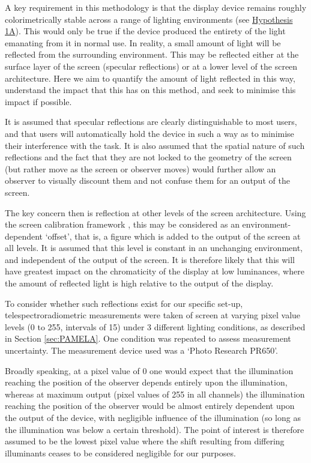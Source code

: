 A key requirement in this methodology is that the display device remains roughly colorimetrically stable across a range of lighting environments (see \hyperref[list:hyp1a]{Hypothesis 1A}). This would only be true if the device produced the entirety of the light emanating from it in normal use. In reality, a small amount of light will be reflected from the surrounding environment. This may be reflected either at the surface layer of the screen (specular reflections) or at a lower level of the screen architecture. Here we aim to quantify the amount of light reflected in this way, understand the impact that this has on this method, and seek to minimise this impact if possible.

It is assumed that specular reflections are clearly distinguishable to most users, and that users will automatically hold the device in such a way as to minimise their interference with the task. It is also assumed that the spatial nature of such reflections and the fact that they are not locked to the geometry of the screen (but rather move as the screen or observer moves) would further allow an observer to visually discount them and not confuse them for an output of the screen.

The key concern then is reflection at other levels of the screen architecture. Using the screen calibration framework \cite{berns_crt_1993}, this may be considered as an environment-dependent `offset', that is, a figure which is added to the output of the screen at all levels. It is assumed that this level is constant in an unchanging environment, and independent of the output of the screen. It is therefore likely that this will have greatest impact on the chromaticity of the display at low luminances, where the amount of reflected light is high relative to the output of the display.

To consider whether such reflections exist for our specific set-up, telespectroradiometric measurements were taken of screen at varying pixel value levels (0 to 255, intervals of 15) under 3 different lighting conditions, as described in Section \ref{sec:PAMELA}. One condition was repeated to assess measurement uncertainty. The measurement device used was a `Photo Research PR650'. 

Broadly speaking, at a pixel value of 0 one would expect that the illumination reaching the position of the observer depends entirely upon the illumination, whereas at maximum output (pixel values of 255 in all channels) the illumination reaching the position of the observer would be almost entirely dependent upon the output of the device, with negligible influence of the illumination (so long as the illumination was below a certain threshold). The point of interest is therefore assumed to be the lowest pixel value where the shift resulting from differing illuminants ceases to be considered negligible for our purposes.

